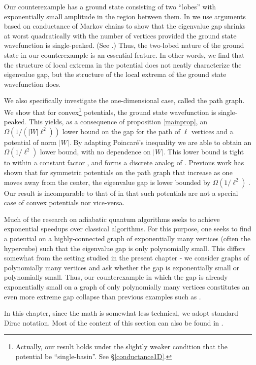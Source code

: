 Our counterexample has a ground state consisting of two ``lobes'' with
exponentially small amplitude in the region between them. In  we use arguments based on conductance of Markov
chains to show that the eigenvalue gap shrinks at worst quadratically
with the number of vertices provided the ground state wavefunction is
single-peaked. (See .) Thus, the two-lobed
nature of the ground state in our counterexample is an essential
feature. In other words, we find that the structure of local extrema
in the potential does not neatly characterize the eigenvalue gap, but
the structure of the local extrema of the ground state wavefunction
does.

We also specifically investigate the one-dimensional case, called the
path graph. We show that for convex\footnote{Actually, our result
  holds under the slightly weaker condition that the potential be
  ``single-basin''. See \S \ref{conductance1D}.} potentials, the
ground state wavefunction is single-peaked. This yields, as a consequence
of proposition \ref{mainprop}, an $\Omega(1/(|W|\ell^2))$ lower bound
on the gap for the path of $\ell$ vertices and a potential of norm
$|W|$. By adapting Poincar\'e's inequality we are able to obtain an
$\Omega(1/\ell^2)$ lower bound, with no dependence on $|W|$. This
lower bound is tight to within a constant factor \cite{Jarret2014c},
and forms a discrete analog of \cite{PW}. Previous work has shown that
for symmetric potentials on the path graph that increase as one moves
away from the center, the eigenvalue gap is lower bounded by
$\Omega(1/\ell^2)$ \cite{ashbaugh1990some}. Our result is incomparable to that of
\cite{ashbaugh1990some} in that such potentials are not a special case of convex
potentials nor vice-versa.

Much of the research on adiabatic quantum algorithms seeks to achieve
exponential speedups over classical algorithms. For this purpose, one
seeks to find a potential on a highly-connected graph of exponentially
many vertices (often the hypercube) such that the eigenvalue gap is
only polynomially small. This differs somewhat from the setting
studied in the present chapter - we consider graphs of polynomially many
vertices and ask whether the gap is exponentially small or
polynomially small. Thus, our counterexample in which the gap is
already exponentially small on a graph of only polynomially many
vertices constitutes an even more extreme gap collapse than previous
examples such as \cite{AKR10}. 

In this chapter, since the math is somewhat less technical, we adopt standard Dirac notation. Most of the content of this section can also be found in \cite{Jarret2014b}.

